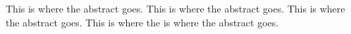 This is where the abstract goes.  This is where the abstract
goes. This is where the abstract goes.  This is where the 
is where the abstract goes.
